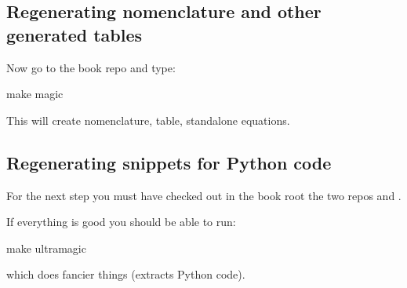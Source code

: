 \subsection{Regenerating nomenclature and other generated tables}



Now go to the book repo and type:

\begin{console}
make magic
\end{console}

This will create nomenclature, table, standalone equations.

\subsection{Regenerating snippets for Python code}


For the next step you must have checked out in the book root the two repos
 and .


If everything is good you should be able to run:
\begin{console}
make ultramagic
\end{console}
which does fancier things (extracts Python code).
